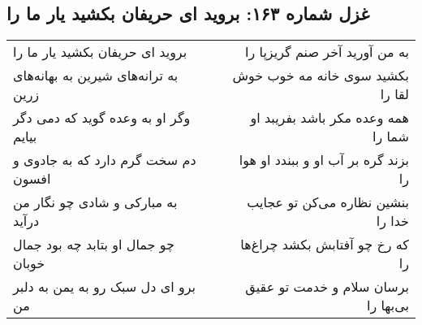 \begin{center}
\section*{غزل شماره ۱۶۳: بروید ای حریفان بکشید یار ما را}
\label{sec:0163}
\begin{longtable}{l p{0.5cm} r}
بروید ای حریفان بکشید یار ما را
&&
به من آورید آخر صنم گریزپا را
\\
به ترانه‌های شیرین به بهانه‌های زرین
&&
بکشید سوی خانه مه خوب خوش لقا را
\\
وگر او به وعده گوید که دمی دگر بیایم
&&
همه وعده مکر باشد بفریبد او شما را
\\
دم سخت گرم دارد که به جادوی و افسون
&&
بزند گره بر آب او و ببندد او هوا را
\\
به مبارکی و شادی چو نگار من درآید
&&
بنشین نظاره می‌کن تو عجایب خدا را
\\
چو جمال او بتابد چه بود جمال خوبان
&&
که رخ چو آفتابش بکشد چراغ‌ها را
\\
برو ای دل سبک رو به یمن به دلبر من
&&
برسان سلام و خدمت تو عقیق بی‌بها را
\\
\end{longtable}
\end{center}
